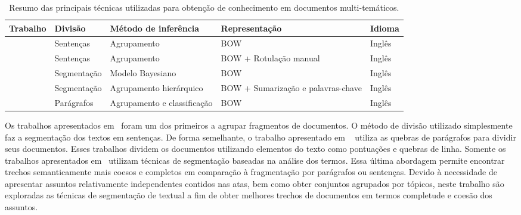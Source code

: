 \begin{table}[!h]
	\centering \tiny 
	\begin{tabular}{|l|l|l|p{2.8cm}|l|} \hline
		\textbf{Trabalho} & \textbf{Divisão} & \textbf{Método de inferência}  & \textbf{Representação} & \textbf{Idioma}\\
		\hline\hline 
	
		\cite{Zamir1998} &      	Sentenças  & Agrupamento                 & BOW & Inglês \\ \hline
		\cite{Masao:2000} &        	Sentenças  & Agrupamento                 & BOW +  Rotulação  manual & Inglês \\ \hline
		\cite{Jeong:2010} &        	Segmentação   & Modelo Bayesiano            & BOW & Inglês \\ \hline
		\cite{Cuong2011} &              	Segmentação  & Agrupamento hierárquico     & BOW + Sumarização e palavras-chave& Inglês  \\ \hline
		\cite{Tagarelli2013} &  	Parágrafos & Agrupamento e classificação & BOW & Inglês \\ \hline

	\end{tabular}
	\caption{Resumo das principais técnicas utilizadas para obtenção de conhecimento em documentos multi-temáticos.}
	\label{tab:resumo-trabalhos}

\end{table}



Os trabalhos apresentados em~\cite{Zamir1998, Masao:2000} foram um dos primeiros a agrupar fragmentos de documentos. O método de divisão utilizado simplesmente faz a segmentação dos textos em sentenças. De forma semelhante, o trabalho apresentado em ~\cite{Tagarelli2013} utiliza as quebras de parágrafos para dividir seus documentos. 
Esses trabalhos dividem os documentos utilizando elementos do texto como pontuações e quebras de linha. Somente os trabalhos apresentados em~\cite{Cuong2011, Jeong:2010} utilizam técnicas de segmentação baseadas na análise dos termos.
Essa última abordagem permite encontrar trechos semanticamente mais coesos e completos em comparação à fragmentação por parágrafos ou sentenças.
Devido à necessidade de apresentar assuntos relativamente independentes contidos nas atas, bem como obter conjuntos agrupados por tópicos, neste trabalho são exploradas as técnicas de segmentação de textual a fim de obter melhores trechos de documentos em termos completude e coesão dos assuntos.


